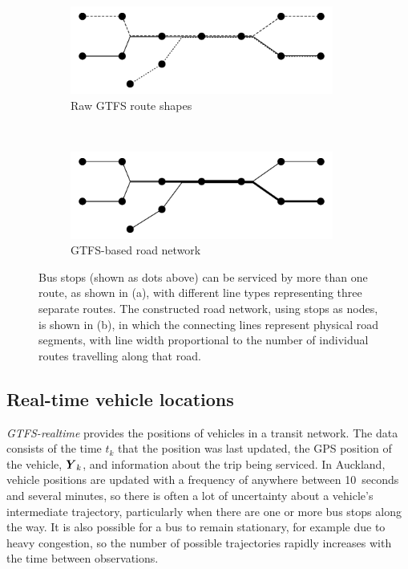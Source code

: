 \begin{figure}[tb]
    \centering
    \begin{subfigure}{0.7\textwidth}
        \centering
        \includegraphics[width=0.95\textwidth]{figures/02_network_segments_1.pdf}
        \caption{Raw GTFS route shapes}
        \label{fig:network_creation_1}
    \end{subfigure} \\
    \begin{subfigure}{0.7\textwidth}
        \centering
        \includegraphics[width=0.95\textwidth]{figures/02_network_segments_2.pdf}
        \caption{GTFS-based road network}
        \label{fig:network_creation_2}
    \end{subfigure}
    \caption{
        Bus stops (shown as dots above) can be serviced by more than one route, 
        as shown in (a), with different line types representing three separate routes.
        The constructed road network, using stops as nodes, is shown in (b),
        in which the connecting lines represent physical road segments,
        with line width proportional to the number of individual routes 
        travelling along that road.
    }
    \label{fig:network_creation}
\end{figure}


\subsection{Real-time vehicle locations}
\label{sec:realtime_data}

\emph{GTFS-realtime} provides the positions of vehicles in a transit network.
The data consists of the time $t_k$ that the position was last updated,
the GPS position of the vehicle, $\mbox{$\boldsymbol{Y}$}_k$, 
and information about the trip being serviced.
In Auckland, vehicle positions are updated with a frequency of anywhere between 10~seconds and several minutes,
so there is often a lot of uncertainty about a vehicle's intermediate trajectory,
particularly when there are one or more bus stops along the way.
It is also possible for a bus to remain stationary,
for example due to heavy congestion,
so the number of possible trajectories rapidly increases with 
the time between observations.


